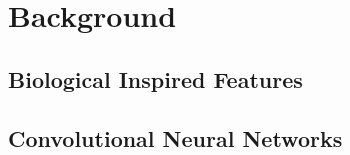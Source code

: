 \chapter{Background} \label{chap:background}

\section{Biological Inspired Features}

\section{Convolutional Neural Networks}
